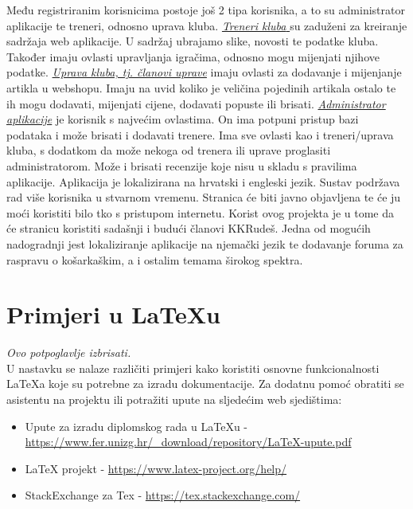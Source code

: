\bigbreak
\textnormal {Među registriranim korisnicima postoje još 2 tipa korisnika, a to su administrator aplikacije te treneri, odnosno uprava kluba.}
\bigbreak
\underline{\textit{Treneri kluba} }\textnormal {su zaduženi za kreiranje sadržaja web aplikacije. U sadržaj ubrajamo slike, novosti te podatke kluba.  Također imaju ovlasti upravljanja igračima, odnosno mogu mijenjati njihove podatke.}
\bigbreak
\underline{\textit{Uprava kluba, tj. članovi uprave}} \textnormal {imaju ovlasti za dodavanje i mijenjanje artikla u webshopu. Imaju na uvid koliko je veličina pojedinih artikala ostalo te ih mogu dodavati, mijenjati cijene, dodavati popuste ili brisati.}
\bigbreak
\textit{\underline{Administrator  aplikacije} }\textnormal {je korisnik s najvećim ovlastima. On ima potpuni pristup bazi podataka i može brisati i dodavati trenere. Ima sve ovlasti kao i treneri/uprava kluba, s dodatkom da može nekoga od trenera ili uprave proglasiti administratorom. Može i brisati recenzije koje nisu u skladu s pravilima aplikacije.}
\bigbreak
\textnormal{Aplikacija je lokalizirana na hrvatski i engleski jezik. Sustav podržava rad više korisnika u stvarnom vremenu.}
\textnormal{Stranica će biti javno objavljena te će ju moći koristiti bilo tko s pristupom internetu. Korist ovog projekta je u tome da će stranicu koristiti sadašnji i budući članovi KKRudeš. Jedna od mogućih nadogradnji jest lokaliziranje aplikacije na njemački jezik te dodavanje foruma za raspravu o košarkaškim, a i ostalim temama širokog spektra.}
		
		


		
		\section{Primjeri u LaTeXu}
		
		\textit{Ovo potpoglavlje izbrisati.}\\

		U nastavku se nalaze različiti primjeri kako koristiti osnovne funkcionalnosti LaTeXa koje su potrebne za izradu dokumentacije. Za dodatnu pomoć obratiti se asistentu na projektu ili potražiti upute na sljedećim web sjedištima:
		\begin{itemize}
			\item Upute za izradu diplomskog rada u LaTeXu - \url{https://www.fer.unizg.hr/_download/repository/LaTeX-upute.pdf}
			\item LaTeX projekt - \url{https://www.latex-project.org/help/}
			\item StackExchange za Tex - \url{https://tex.stackexchange.com/}\\
		
		\end{itemize} 	


